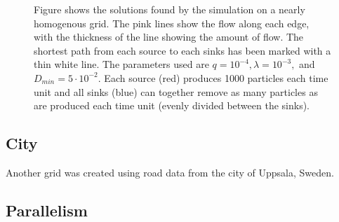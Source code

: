 \begin{figure}
\begin{subfigure}[b]{0.48\textwidth}
\end{subfigure}
\caption{Figure shows the solutions found by the simulation on a nearly homogenous grid. The pink lines show the flow along each edge, with the thickness of the line showing the amount of flow. The shortest path from each source to each sinks has been marked with a thin white line. The parameters used are $q = 10^{-4},\lambda = 10^{-3},$ and $D_{min}=5 \cdot 10^{-2}$. Each source (red) produces 1000 particles each time unit and all sinks (blue) can together remove as many particles as are produced each time unit (evenly divided between the sinks).}
\label{fig:homogeneous}
\end{figure}

\subsection{City}

Another grid was created using road data from the city of Uppsala, Sweden.

\subsection{Parallelism}
